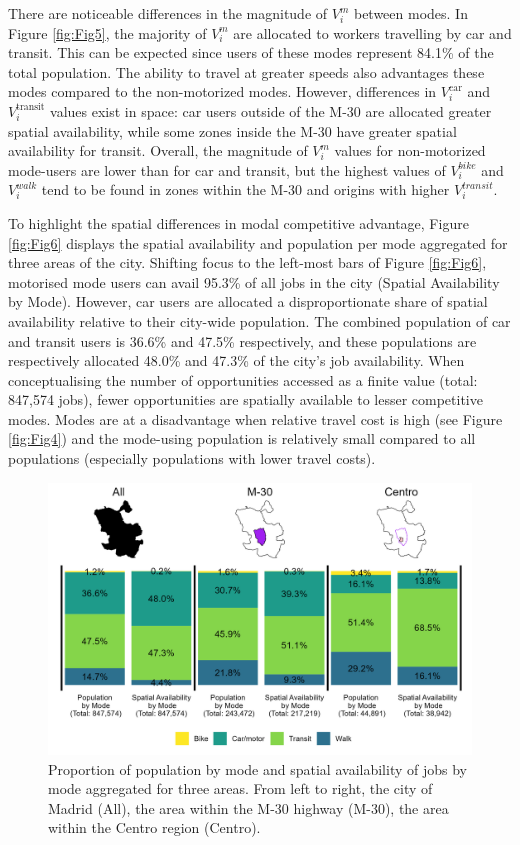 \documentclass[10pt,letterpaper]{article}
\begin{document}
There are noticeable differences in the magnitude of \(V_i^m\) between
modes. In Figure \ref{fig:Fig5}, the majority of \(V_i^m\) are allocated
to workers travelling by car and transit. This can be expected since
users of these modes represent 84.1\% of the total population. The
ability to travel at greater speeds also advantages these modes compared
to the non-motorized modes. However, differences in \(V_i^\text{car}\)
and \(V_i^\text{transit}\) values exist in space: car users outside of
the M-30 are allocated greater spatial availability, while some zones
inside the M-30 have greater spatial availability for transit. Overall,
the magnitude of \(V_i^m\) values for non-motorized mode-users are lower
than for car and transit, but the highest values of \(V_i^{bike}\) and
\(V_i^{walk}\) tend to be found in zones within the M-30 and origins
with higher \(V_i^{transit}\).

To highlight the spatial differences in modal competitive advantage,
Figure \ref{fig:Fig6} displays the spatial availability and population
per mode aggregated for three areas of the city. Shifting focus to the
left-most bars of Figure \ref{fig:Fig6}, motorised mode users can avail
95.3\% of all jobs in the city (Spatial Availability by Mode). However,
car users are allocated a disproportionate share of spatial availability
relative to their city-wide population. The combined population of car
and transit users is 36.6\% and 47.5\% respectively, and these
populations are respectively allocated 48.0\% and 47.3\% of the city's
job availability. When conceptualising the number of opportunities
accessed as a finite value (total: 847,574 jobs), fewer opportunities
are spatially available to lesser competitive modes. Modes are at a
disadvantage when relative travel cost is high (see Figure
\ref{fig:Fig4}) and the mode-using population is relatively small
compared to all populations (especially populations with lower travel
costs).

\begin{figure}

{\centering \includegraphics[width=0.85\linewidth]{images/Fig6} 

}

\caption{\label{fig:Fig6} Proportion of population by mode and spatial availability of jobs by mode aggregated for three areas. From left to right, the city of Madrid (All), the area within the M-30 highway (M-30), the area within the Centro region (Centro).}\label{fig:modal-V-comps-plot}
\end{figure}
\end{document}
